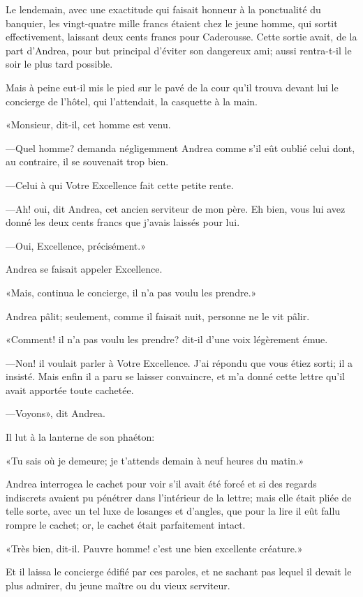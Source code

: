 Le lendemain, avec une exactitude qui faisait honneur à la ponctualité du banquier, les vingt-quatre mille francs étaient chez le jeune homme, qui sortit effectivement, laissant deux cents francs pour Caderousse. Cette sortie avait, de la part d'Andrea, pour but principal d'éviter son dangereux ami; aussi rentra-t-il le soir le plus tard possible. 

Mais à peine eut-il mis le pied sur le pavé de la cour qu'il trouva devant lui le concierge de l'hôtel, qui l'attendait, la casquette à la main. 

«Monsieur, dit-il, cet homme est venu. 

—Quel homme? demanda négligemment Andrea comme s'il eût oublié celui dont, au contraire, il se souvenait trop bien. 

—Celui à qui Votre Excellence fait cette petite rente. 

—Ah! oui, dit Andrea, cet ancien serviteur de mon père. Eh bien, vous lui avez donné les deux cents francs que j'avais laissés pour lui. 

—Oui, Excellence, précisément.» 

Andrea se faisait appeler Excellence. 

«Mais, continua le concierge, il n'a pas voulu les prendre.» 

Andrea pâlit; seulement, comme il faisait nuit, personne ne le vit pâlir. 

«Comment! il n'a pas voulu les prendre? dit-il d'une voix légèrement émue. 

—Non! il voulait parler à Votre Excellence. J'ai répondu que vous étiez sorti; il a insisté. Mais enfin il a paru se laisser convaincre, et m'a donné cette lettre qu'il avait apportée toute cachetée. 

—Voyons», dit Andrea. 

Il lut à la lanterne de son phaéton: 

«Tu sais où je demeure; je t'attends demain à neuf heures du matin.» 

Andrea interrogea le cachet pour voir s'il avait été forcé et si des regards indiscrets avaient pu pénétrer dans l'intérieur de la lettre; mais elle était pliée de telle sorte, avec un tel luxe de losanges et d'angles, que pour la lire il eût fallu rompre le cachet; or, le cachet était parfaitement intact. 

«Très bien, dit-il. Pauvre homme! c'est une bien excellente créature.» 

Et il laissa le concierge édifié par ces paroles, et ne sachant pas lequel il devait le plus admirer, du jeune maître ou du vieux serviteur. 

